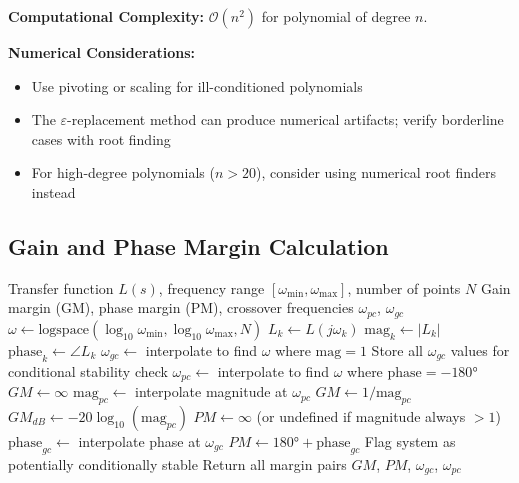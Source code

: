 \textbf{Computational Complexity:} $\mathcal{O}(n^2)$ for polynomial of degree $n$.

\textbf{Numerical Considerations:}
\begin{itemize}
    \item Use pivoting or scaling for ill-conditioned polynomials
    \item The $\varepsilon$-replacement method can produce numerical artifacts; verify borderline cases with root finding
    \item For high-degree polynomials ($n > 20$), consider using numerical root finders instead
\end{itemize}

\subsection{Gain and Phase Margin Calculation}

\begin{algorithm}[H]
\caption{Stability Margins from Frequency Response}
\label{alg:margins}
\begin{algorithmic}[1]
\REQUIRE Transfer function $L(s)$, frequency range $[\omega_{\min}, \omega_{\max}]$, number of points $N$
\ENSURE Gain margin (GM), phase margin (PM), crossover frequencies $\omega_{pc}$, $\omega_{gc}$
\STATE
\STATE {}
\STATE $\omega \gets \text{logspace}(\log_{10}\omega_{\min}, \log_{10}\omega_{\max}, N)$
\STATE
\STATE {}
    \STATE $L_k \gets L(j\omega_k)$
    \STATE $\text{mag}_k \gets |L_k|$
    \STATE $\text{phase}_k \gets \angle L_k$ 
\ENDFOR
\STATE
\STATE {}
\STATE $\omega_{gc} \gets$ interpolate to find $\omega$ where $\text{mag} = 1$
    \STATE Store all $\omega_{gc}$ values for conditional stability check
\ENDIF
\STATE
\STATE {}
\STATE $\omega_{pc} \gets$ interpolate to find $\omega$ where $\text{phase} = -180°$
    \STATE $GM \gets \infty$ 
\ELSE
    \STATE $\text{mag}_{pc} \gets$ interpolate magnitude at $\omega_{pc}$
    \STATE $GM \gets 1/\text{mag}_{pc}$
    \STATE $GM_{dB} \gets -20\log_{10}(\text{mag}_{pc})$
\ENDIF
\STATE
\STATE {}
    \STATE $PM \gets \infty$ (or undefined if magnitude always $> 1$)
\ELSE
    \STATE $\text{phase}_{gc} \gets$ interpolate phase at $\omega_{gc}$
    \STATE $PM \gets 180° + \text{phase}_{gc}$
\ENDIF
\STATE
\STATE {}
    \STATE Flag system as potentially conditionally stable
    \STATE Return all margin pairs
\ENDIF
\STATE
\RETURN $GM$, $PM$, $\omega_{gc}$, $\omega_{pc}$
\end{algorithmic}
\end{algorithm}

